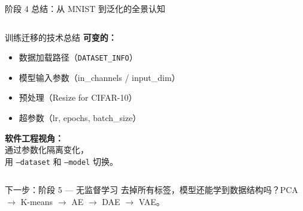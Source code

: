 \documentclass[aspectratio=169]{ctexbeamer}
\begin{document}
\begin{frame}[shrink=22]{阶段 4 总结：从 MNIST 到泛化的全景认知}
\begin{columns}[T]
\begin{block}{训练迁移的技术总结}
\textbf{可变的：}
\begin{itemize}
  \item 数据加载路径（\texttt{DATASET\_INFO}）
  \item 模型输入参数（in\_channels / input\_dim）
  \item 预处理（Resize for CIFAR-10）
  \item 超参数（lr, epochs, batch\_size）
\end{itemize}

\textbf{软件工程视角：}\\
通过参数化隔离变化，\\
用 \texttt{--dataset} 和 \texttt{--model} 切换。
\end{block}
\end{columns}

\vspace{0.1cm}

\begin{block}{下一步：阶段 5 — 无监督学习}
\footnotesize
去掉所有标签，模型还能学到数据结构吗？PCA $\to$ K-means $\to$ AE $\to$ DAE $\to$ VAE。
\end{block}
\end{frame}

\end{document}
